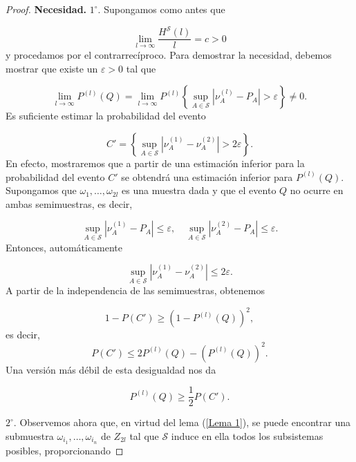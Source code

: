 \documentclass{report}
\begin{document}
\begin{proof}
\textbf{Necesidad.}
\( 1^\circ \). Supongamos como antes que

\begin{equation}\label{eq 23}
\lim_{l \to \infty} \frac{H^{\mathcal{S}}(l)}{l} = c > 0
\end{equation}
y procedamos por el contrarrecíproco. Para demostrar la necesidad, debemos mostrar que existe un \( \varepsilon > 0 \) tal que

\begin{equation*}
\lim_{l \to \infty} P^{(l)}(Q) = \lim_{l \to \infty} P^{(l)} \left\{ \sup_{A \in \mathcal{S}} \left| \nu_A^{(l)} - P_A \right| > \varepsilon \right\} \neq 0.
\end{equation*}
Es suficiente estimar la probabilidad del evento

\begin{equation*}
C' = \left\{ \sup_{A \in \mathcal{S}} \left| \nu_A^{(1)} - \nu_A^{(2)} \right| > 2\varepsilon \right\}.
\end{equation*}
En efecto, mostraremos que a partir de una estimación inferior para la probabilidad del evento \( C' \) se obtendrá una estimación inferior para \( P^{(l)}(Q) \). Supongamos que \( \omega_1, \dots, \omega_{2l} \) es una muestra dada y que el evento \( Q \) no ocurre en ambas semimuestras, es decir,

\begin{equation*}
\sup_{A \in \mathcal{S}} \left| \nu_A^{(1)} - P_A \right| \leq \varepsilon, \quad \sup_{A \in \mathcal{S}} \left| \nu_A^{(2)} - P_A \right| \leq \varepsilon.
\end{equation*}
Entonces, automáticamente

\begin{equation*}
\sup_{A \in \mathcal{S}} \left| \nu_A^{(1)} - \nu_A^{(2)} \right| \leq 2\varepsilon.
\end{equation*}
A partir de la independencia de las semimuestras, obtenemos

\begin{equation*}
1 - P(C') \geq (1 - P^{(l)}(Q))^2,
\end{equation*}
es decir,
\[
P(C') \leq 2P^{(l)}(Q) - \left(P^{(l)}(Q)\right)^2.
\]
Una versión más débil de esta desigualdad nos da

\begin{equation*}
P^{(l)}(Q) \geq \frac{1}{2} P(C').
\end{equation*}

\bigskip
\( 2^\circ \). Observemos ahora que, en virtud del lema (\ref{Lema 1}), se puede encontrar una submuestra \( \omega_{i_1}, \dots, \omega_{i_n} \) de \( Z_{2l} \) tal que \( \mathcal{S} \) induce en ella todos los subsistemas posibles, proporcionando


\end{proof}
\end{document}
